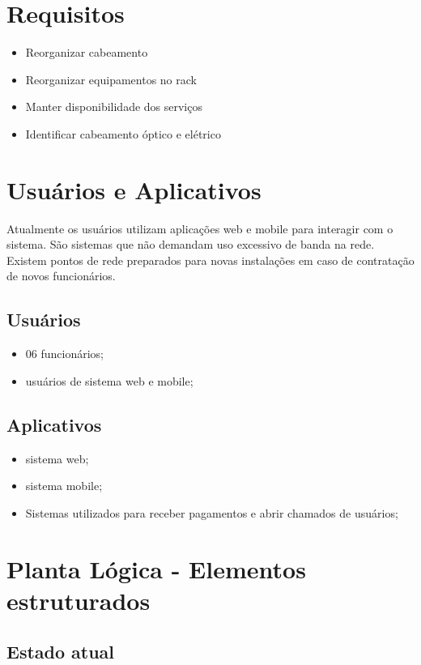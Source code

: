\documentclass[	DIV=calc,%
paper=a4,%
fontsize=12pt,%
onecolumn]{scrartcl}	 					%
\begin{document}
	\section{Requisitos}
	\begin{itemize}
		\item Reorganizar cabeamento
		\item Reorganizar equipamentos no rack
		\item Manter disponibilidade dos serviços
		\item Identificar cabeamento óptico e elétrico
	\end{itemize}
	
	\section{Usuários e Aplicativos}
	Atualmente os usuários utilizam aplicações web e mobile para interagir com o sistema. São sistemas que não demandam uso excessivo de banda na rede. Existem pontos de rede preparados para novas instalações em caso de contratação de novos funcionários.
	
	
	\subsection{Usuários}
	\begin{itemize}
		\item 06 funcionários;
		\item usuários de sistema web e mobile;
	\end{itemize}
	
	\subsection{Aplicativos}
	\begin{itemize}
		\item sistema web;
		\item sistema mobile;
		\item Sistemas utilizados para receber pagamentos e abrir chamados de usuários;
	\end{itemize}
	

	\section{Planta Lógica - Elementos estruturados}
	
	\subsection{Estado atual}
\end{document}
